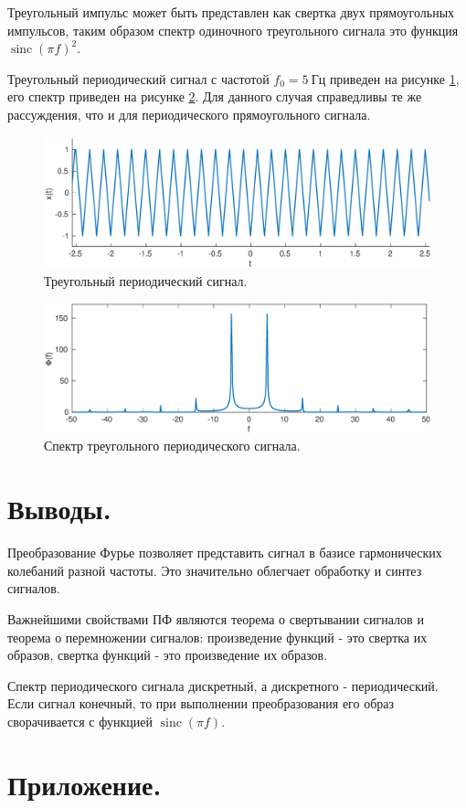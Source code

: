 \documentclass[a4paper,14pt]{extarticle}
\DeclareMathOperator{\sinc}{sinc}
\begin{document}
Треугольный импульс может быть представлен как свертка двух прямоугольных импульсов, таким образом спектр одиночного треугольного сигнала это функция $\sinc(\pi f)^2$.

Треугольный периодический сигнал с частотой $f_0 = 5~\text{Гц}$ приведен на рисунке \ref{trg_x}, его спектр приведен на рисунке \ref{trg_s}. Для данного случая справедливы те же рассуждения, что и для периодического прямоугольного сигнала.

\begin{figure}[H]
\includegraphics[width=1\textwidth]{trg_x.eps}
\caption{Треугольный периодический сигнал.}
\label{trg_x}
\end{figure}

\begin{figure}[H]
\includegraphics[width=1\textwidth]{trg_s.eps}
\caption{Спектр треугольного периодического сигнала.}
\label{trg_s}
\end{figure}


\section{Выводы.}

Преобразование Фурье позволяет представить сигнал в базисе гармонических колебаний разной частоты. Это значительно облегчает обработку и синтез сигналов.

Важнейшими свойствами ПФ являются теорема о свертывании сигналов и теорема о перемножении сигналов: произведение функций - это свертка их образов, свертка функций - это произведение их образов.

Спектр периодического сигнала дискретный, а дискретного - периодический. Если сигнал конечный, то при выполнении преобразования его образ сворачивается с функцией $\sinc(\pi f)$. 

\section{Приложение.}


\end{document}
